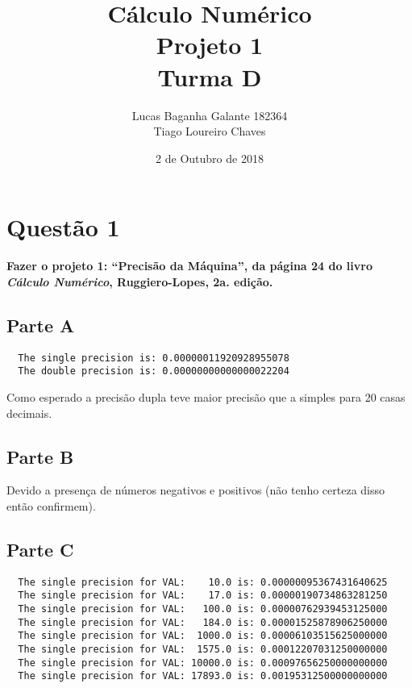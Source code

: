 \documentclass[12pt,a4paper,final]{article}
\author{Lucas Baganha Galante 182364\\Tiago Loureiro Chaves }
\title{Cálculo Numérico \\ Projeto 1 \\  \normalsize{Turma D}}
\date{ 2 de Outubro de 2018}
\begin{document}
\onehalfspace %

\maketitle


\section{Questão 1}
\textbf{Fazer o projeto 1: ``Precisão da Máquina'',
da página 24 do livro \textit{Cálculo Numérico}, Ruggiero-Lopes, 2a. edição.}

\subsection{Parte A}

\begin{lstlisting}
  The single precision is: 0.00000011920928955078
  The double precision is: 0.00000000000000022204
\end{lstlisting}

Como esperado a precisão dupla teve maior precisão que a simples para 20 casas decimais.

\subsection{Parte B}

Devido a presença de números negativos e positivos (não tenho certeza disso então confirmem).

\subsection{Parte C}

\begin{lstlisting}
  The single precision for VAL:    10.0 is: 0.00000095367431640625
  The single precision for VAL:    17.0 is: 0.00000190734863281250
  The single precision for VAL:   100.0 is: 0.00000762939453125000
  The single precision for VAL:   184.0 is: 0.00001525878906250000
  The single precision for VAL:  1000.0 is: 0.00006103515625000000
  The single precision for VAL:  1575.0 is: 0.00012207031250000000
  The single precision for VAL: 10000.0 is: 0.00097656250000000000
  The single precision for VAL: 17893.0 is: 0.00195312500000000000
\end{lstlisting}
\end{document}
